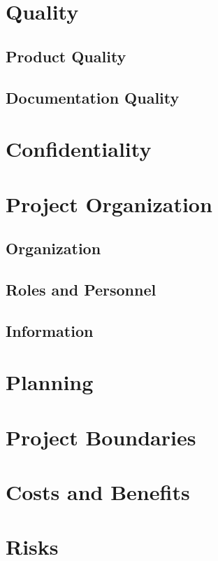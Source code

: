 \documentclass{article}
\begin{document}
\newpage
\section{Quality}
\subsection{Product Quality}
\subsection{Documentation Quality}


\newpage
\section{Confidentiality}


\newpage
\section{Project Organization}
\subsection{Organization}
\subsection{Roles and Personnel}
\subsection{Information}


\newpage
\section{Planning}


\newpage
\section{Project Boundaries}


\newpage
\section{Costs and Benefits}


\newpage
\section{Risks}
\end{document}
